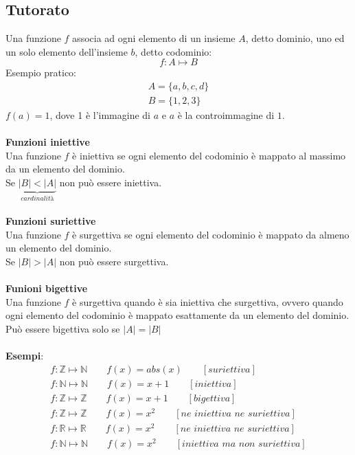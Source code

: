 \documentclass[italian]{article}
\begin{document}
\subsection{Tutorato}
Una funzione $f$ associa ad ogni elemento di un insieme $A$, detto dominio, uno ed un solo elemento dell'insieme $b$, detto codominio:
\[f: A \longmapsto B\]
Esempio pratico:
\begin{gather*}
	A=\{a,b,c,d\}\\
	B=\{1,2,3\}
\end{gather*}
$f(a) = 1$, dove 1 è l'immagine di $a$ e $a$ è la controimmagine di $1$.\\\\
\textbf{Funzioni iniettive}\\
Una funzione $f$ è iniettiva se ogni elemento del codominio è mappato al massimo da un elemento del dominio.\\Se $\underbrace{|B|<|A|}_{cardinalità}$ non può essere iniettiva.\\\\
\textbf{Funzioni suriettive}\\
Una funzione $f$ è surgettiva se ogni elemento del codominio è mappato da almeno un elemento del dominio.\\Se $|B|>|A|$ non può essere surgettiva.\\\\
\textbf{Funioni bigettive}\\
Una funzione $f$ è surgettiva quando è sia iniettiva che surgettiva, ovvero quando ogni elemento del codominio è mappato esattamente da un elemento del dominio. Può essere bigettiva solo se $|A|=|B|$\\\\
\textbf{Esempi}:\\
\begin{gather}
	f: \mathbb{Z}\longmapsto \mathbb{N} \qquad f(x) = abs(x) \qquad [\textit{suriettiva}]\\
	f: \mathbb{N}\longmapsto \mathbb{N} \qquad f(x) = x+1 \qquad [\textit{iniettiva}] \\
	f: \mathbb{Z}\longmapsto \mathbb{Z} \qquad f(x) = x+1 \qquad [\textit{bigettiva}]\\
	f: \mathbb{Z}\longmapsto \mathbb{Z} \qquad f(x) = x^2 \qquad [\textit{ne iniettiva ne suriettiva}] \\
	f: \mathbb{R}\longmapsto \mathbb{R} \qquad f(x) = x^2 \qquad [\textit{ne iniettiva ne suriettiva}] \\
	f: \mathbb{N}\longmapsto \mathbb{N} \qquad f(x) = x^2 \qquad [\textit{iniettiva ma non suriettiva}]
\end{gather}
\end{document}
